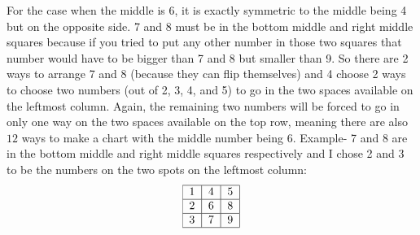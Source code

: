 \begin{enumerate}
 For the case when the middle is 6, it is exactly symmetric to the middle being 4 but on the opposite side. 7 and 8 must be in the bottom middle and right middle squares because if you tried to put any other number in those two squares that number would have to be bigger than 7 and 8 but smaller than 9. So there are 2 ways to arrange 7 and 8 (because they can flip themselves) and 4 choose 2 ways to choose two numbers (out of 2, 3, 4, and 5) to go in the two spaces available on the leftmost column. Again, the remaining two numbers will be forced to go in only one way on the two spaces available on the top row, meaning there are also $12$ ways to make a chart with the middle number being 6. Example- 7 and 8 are in the bottom middle and right middle squares respectively and I chose 2 and 3 to be the numbers on the two spots on the leftmost column:
 \[\begin{tabular}{|c|c|c|}  \hline 1&4&5\\ \hline 2&6&8\\ \hline 3&7&9\\ \hline \end{tabular}\]


\end{enumerate}
